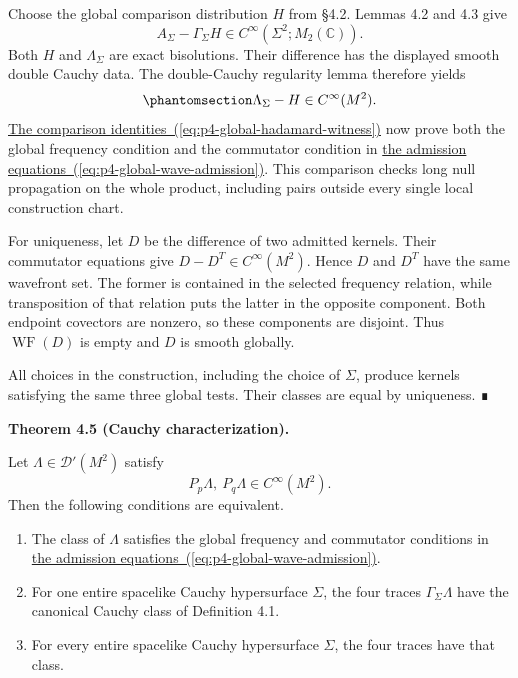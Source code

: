\documentclass[
  english,
  11pt,
  reqno]{amsart}
\makeatletter
\providecommand{\tightlist}{%
  \setlength{\itemsep}{0pt}\setlength{\parskip}{0pt}}
\newcommand{\pandocstatementheading}[1]{%
  \par\addpenalty{\@beginparpenalty}%
  \addvspace{.5\baselineskip plus .2\baselineskip minus .2\baselineskip}%
  {\normalfont\bfseries #1\par}%
  \nobreak\@afterindenttrue\@afterheading
}
\makeatother
\begin{document}
Choose the global comparison distribution \(H\) from §4.2. Lemmas 4.2
and 4.3 give \[
A_\Sigma-\Gamma_\Sigma H\in C^\infty(\Sigma^2;M_2(\mathbb C)).
\] Both \(H\) and \(\Lambda_\Sigma\) are exact bisolutions. Their
difference has the displayed smooth double Cauchy data. The
double-Cauchy regularity lemma therefore yields
\begin{equation}\protect\phantomsection\label{eq:p4-construction-witness-smoothing}{
\Lambda_\Sigma-H\in C^\infty(M^2).
}\end{equation} \hyperref[eq:p4-global-hadamard-witness]{The comparison
identities~(\ref*{eq:p4-global-hadamard-witness})} now prove both the global frequency condition and the
commutator condition in \hyperref[eq:p4-global-wave-admission]{the
admission equations~(\ref*{eq:p4-global-wave-admission})}. This comparison checks long null propagation on
the whole product, including pairs outside every single local
construction chart.

For uniqueness, let \(D\) be the difference of two admitted kernels.
Their commutator equations give \(D-D^T\in C^\infty(M^2)\). Hence \(D\)
and \(D^T\) have the same wavefront set. The former is contained in the
selected frequency relation, while transposition of that relation puts
the latter in the opposite component. Both endpoint covectors are
nonzero, so these components are disjoint. Thus \(\operatorname{WF}(D)\)
is empty and \(D\) is smooth globally.

All choices in the construction, including the choice of \(\Sigma\),
produce kernels satisfying the same three global tests. Their classes
are equal by uniqueness. ∎

\pandocstatementheading{\protect{}\label{thm:p4-global-cauchy-characterization}Theorem 4.5 (Cauchy characterization).}

Let \(\Lambda\in\mathcal D'(M^2)\) satisfy \[
P_p\Lambda,\ P_q\Lambda\in C^\infty(M^2).
\] Then the following conditions are equivalent.

\begin{enumerate}
\tightlist
\item
  The class of \(\Lambda\) satisfies the global frequency and commutator
  conditions in \hyperref[eq:p4-global-wave-admission]{the admission
  equations~(\ref*{eq:p4-global-wave-admission})}.
\item
  For one entire spacelike Cauchy hypersurface \(\Sigma\), the four
  traces \(\Gamma_\Sigma\Lambda\) have the canonical Cauchy class of
  Definition 4.1.
\item
  For every entire spacelike Cauchy hypersurface \(\Sigma\), the four
  traces have that class.
\end{enumerate}
\end{document}
